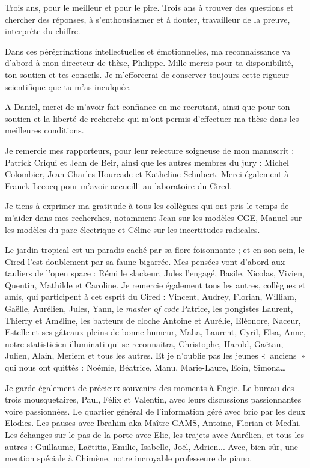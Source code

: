 
Trois ans, pour le meilleur et pour le pire. Trois ans à trouver des questions et chercher des réponses, à s’enthousiasmer et à douter, travailleur de la preuve, interprète du chiffre. 

Dans ces pérégrinations intellectuelles et émotionnelles, ma reconnaissance va d’abord à mon directeur de thèse, Philippe. Mille mercis pour ta disponibilité, ton soutien et tes conseils. Je m'efforcerai de conserver toujours cette rigueur scientifique que tu m'as inculquée. 

A Daniel, merci de m'avoir fait confiance en me recrutant, ainsi que pour ton soutien et la liberté de recherche qui m'ont permis d'effectuer ma thèse dans les meilleures conditions.

Je remercie mes rapporteurs, pour leur relecture soigneuse de mon manuscrit : Patrick Criqui et Jean de Beir, ainsi que les autres membres du jury : Michel Colombier, Jean-Charles Hourcade et Katheline Schubert. Merci également à Franck Lecocq pour m'avoir accueilli au laboratoire du Cired.

Je tiens à exprimer ma gratitude à tous les collègues qui ont pris le temps de m’aider dans mes recherches, notamment Jean sur les modèles CGE, Manuel sur les modèles du parc électrique et Céline sur les incertitudes radicales.

Le jardin tropical est un paradis caché par sa flore foisonnante ; et en son sein, le Cired l’est doublement par sa faune bigarrée. Mes pensées vont d’abord aux tauliers de l’open space : Rémi le slackeur, Jules l'engagé, Basile, Nicolas, Vivien, Quentin, Mathilde et Caroline. Je remercie également tous les autres, collègues et amis, qui participent à cet esprit du Cired : Vincent, Audrey, Florian, William, Gaëlle, Aurélien, Jules, Yann, le \textit{master of code} Patrice, les pongistes Laurent, Thierry et Am\textit{é}line, les batteurs de cloche Antoine et Aurélie, Eléonore, Naceur, Estelle et ses gâteaux pleins de bonne humeur, Maha, Laurent, Cyril, Elsa, Anne, notre statisticien illuminati qui se reconnaitra, Christophe, Harold, Gaëtan, Julien, Alain, Meriem et tous les autres. 
Et je n’oublie pas les jeunes «~anciens~» qui nous ont quittés : Noémie, Béatrice, Manu, Marie-Laure, Eoin, Simona…

Je garde également de précieux souvenirs des moments à Engie. Le bureau des trois mousquetaires, Paul, Félix et Valentin, avec leurs discussions passionnantes voire passionnées. Le quartier général de l'information géré avec brio par les deux Elodies. Les pauses avec Ibrahim aka Maître GAMS, Antoine, Florian et Medhi. Les échanges sur le pas de la porte avec Elie, les trajets avec Aurélien, et tous les autres : Guillaume, Laëtitia, Emilie, Isabelle, Joël, Adrien... Avec, bien sûr, une mention spéciale à Chimène, notre incroyable professeure de piano.

